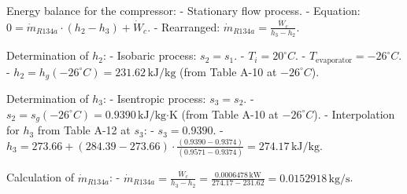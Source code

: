 Energy balance for the compressor:  
- Stationary flow process.  
- Equation: \( 0 = \dot{m}_{R134a} \cdot (h_2 - h_3) + \dot{W}_c \).  
- Rearranged: \( \dot{m}_{R134a} = \frac{\dot{W}_c}{h_3 - h_2} \).  

Determination of \( h_2 \):  
- Isobaric process: \( s_2 = s_1 \).  
- \( T_i = 20^\circ C \).  
- \( T_{\text{evaporator}} = -26^\circ C \).  
- \( h_2 = h_g(-26^\circ C) = 231.62 \, \text{kJ/kg} \) (from Table A-10 at \( -26^\circ C \)).  

Determination of \( h_3 \):  
- Isentropic process: \( s_3 = s_2 \).  
- \( s_2 = s_g(-26^\circ C) = 0.9390 \, \text{kJ/kg·K} \) (from Table A-10 at \( -26^\circ C \)).  
- Interpolation for \( h_3 \) from Table A-12 at \( s_3 \):  
  - \( s_3 = 0.9390 \).  
  - \( h_3 = 273.66 + (284.39 - 273.66) \cdot \frac{(0.9390 - 0.9374)}{(0.9571 - 0.9374)} = 274.17 \, \text{kJ/kg} \).  

Calculation of \( \dot{m}_{R134a} \):  
- \( \dot{m}_{R134a} = \frac{\dot{W}_c}{h_3 - h_2} = \frac{0.0006478 \, \text{kW}}{274.17 - 231.62} = 0.0152918 \, \text{kg/s} \).